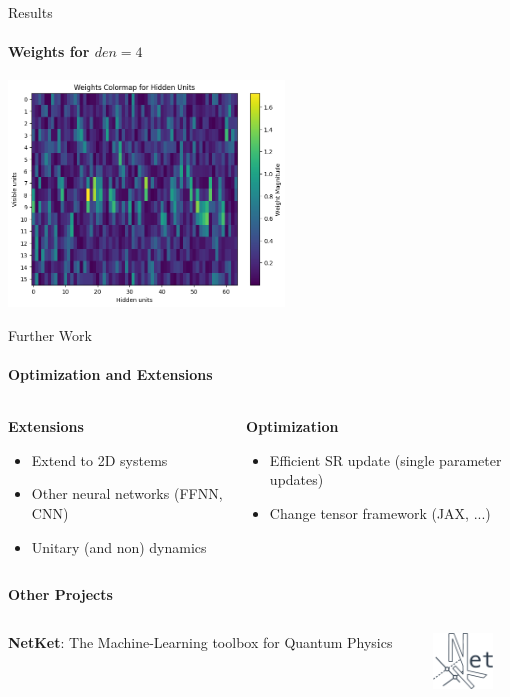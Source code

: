 \documentclass{beamer}
\begin{document}
\begin{frame}{Results}
\framesubtitle{Weights for $den = 4$}
\begin{center}
\includegraphics[height=6cm]{images/16spin_den4_jm1.png}
\end{center}
\end{frame}

\begin{frame}{Further Work}
\framesubtitle{Optimization and Extensions}
\begin{columns}
\begin{column}{0.5\textwidth}
\textbf{Extensions}
\begin{itemize}
	\item Extend to 2D systems
	\item Other neural networks (FFNN, CNN)
	\item Unitary (and non) dynamics
\end{itemize}
\end{column}
\begin{column}{0.5\textwidth}
\textbf{Optimization}
\begin{itemize}
	\item Efficient SR update (single parameter updates)
	\item Change tensor framework (JAX, ...)
\end{itemize}
\end{column}
\end{columns}
\baselineskip
\textbf{Other Projects}

\begin{columns}
\begin{column}{0.8\textwidth}
\textbf{NetKet}: The Machine-Learning toolbox for Quantum Physics
\end{column}
\begin{column}{0.18\textwidth}
\begin{center}	
\includegraphics[height=1.5cm]{images/netket.png}
\end{center}
\end{column}
\end{columns}
\end{frame}
\end{document}
